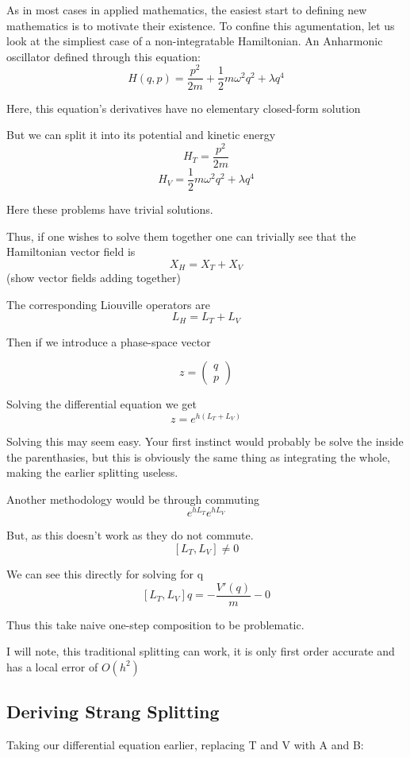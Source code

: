 As in most cases in applied mathematics, the easiest start to defining new mathematics is to motivate their existence. To confine this agumentation, let us look at the simpliest case of a non-integratable Hamiltonian. An Anharmonic oscillator defined through this equation:
\[
	H(q,p) = \frac{p^2}{2m} + \frac{1}{2}m \omega^2q^2 + \lambda q^4
\]

Here, this equation's derivatives have no elementary closed-form solution

But we can split it into its potential and kinetic energy
\[
	H_T = \frac{p^2}{2m}
\]
\[
	H_V = \frac{1}{2}m \omega^2q^2+ \lambda q^4
\]

Here these problems have trivial solutions.

Thus, if one wishes to solve them together one can trivially see that the Hamiltonian vector field is
\[
	X_H = X_T + X_V
\]
(show vector fields adding together)

The corresponding Liouville operators are
\[
	L_H = L_T + L_V
\]

Then if we introduce a phase-space vector

\[
	z =
	\begin{pmatrix}
		q \\
		p
	\end{pmatrix}
\]

Solving the differential equation we get
\[
	z = e^{h(L_T + L_V)}
\]

Solving this may seem easy. Your first instinct would probably be solve the inside the parenthasies, but this is obviously the same thing as integrating the whole, making the earlier splitting useless.

Another methodology would be through commuting
\[
	e^{hL_T}e^{hL_V}
\]

But, as this doesn't work as they do not commute.
\[
	[L_T,L_V] \neq 0
\]

We can see this directly for solving for q
\[
	[L_T, L_V]q = -\frac{V'(q)}{m} - 0
\]

Thus this take naive one-step composition to be problematic.

I will note, this traditional splitting can work, it is only first order accurate and has a local error of $O(h^2)$

\subsection{Deriving Strang Splitting}

Taking our differential equation earlier, replacing T and V with A and B:

